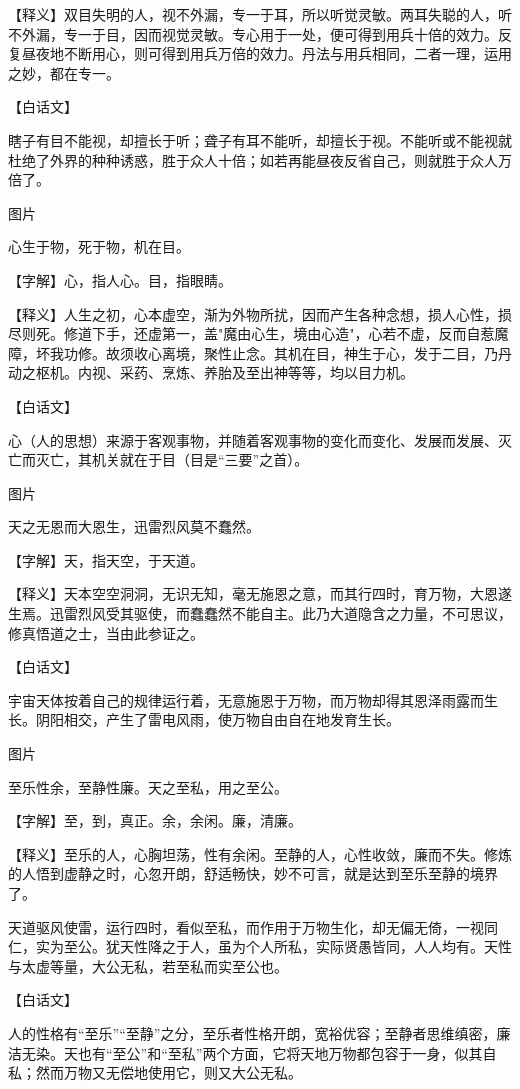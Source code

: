 \documentclass[12pt,UTF8]{ctexbook}
\begin{document}
【释义】双目失明的人，视不外漏，专一于耳，所以听觉灵敏。两耳失聪的人，听不外漏，专一于目，因而视觉灵敏。专心用于一处，便可得到用兵十倍的效力。反复昼夜地不断用心，则可得到用兵万倍的效力。丹法与用兵相同，二者一理，运用之妙，都在专一。


【白话文】


瞎子有目不能视，却擅长于听；聋子有耳不能听，却擅长于视。不能听或不能视就杜绝了外界的种种诱惑，胜于众人十倍；如若再能昼夜反省自己，则就胜于众人万倍了。

图片​


心生于物，死于物，机在目。


【字解】心，指人心。目，指眼睛。


【释义】人生之初，心本虚空，渐为外物所扰，因而产生各种念想，损人心性，损尽则死。修道下手，还虚第一，盖"魔由心生，境由心造"，心若不虚，反而自惹魔障，坏我功修。故须收心离境，聚性止念。其机在目，神生于心，发于二目，乃丹动之枢机。内视、采药、烹炼、养胎及至出神等等，均以目力机。


【白话文】


心（人的思想）来源于客观事物，并随着客观事物的变化而变化、发展而发展、灭亡而灭亡，其机关就在于目（目是“三要”之首）。


图片​


天之无恩而大恩生，迅雷烈风莫不蠢然。


【字解】天，指天空，于天道。


【释义】天本空空洞洞，无识无知，毫无施恩之意，而其行四时，育万物，大恩遂生焉。迅雷烈风受其驱使，而蠢蠢然不能自主。此乃大道隐含之力量，不可思议，修真悟道之士，当由此参证之。


【白话文】


宇宙天体按着自己的规律运行着，无意施恩于万物，而万物却得其恩泽雨露而生长。阴阳相交，产生了雷电风雨，使万物自由自在地发育生长。


图片​


至乐性余，至静性廉。天之至私，用之至公。


【字解】至，到，真正。余，余闲。廉，清廉。


【释义】至乐的人，心胸坦荡，性有余闲。至静的人，心性收敛，廉而不失。修炼的人悟到虚静之时，心忽开朗，舒适畅快，妙不可言，就是达到至乐至静的境界了。


天道驱风使雷，运行四时，看似至私，而作用于万物生化，却无偏无倚，一视同仁，实为至公。犹天性降之于人，虽为个人所私，实际贤愚皆同，人人均有。天性与太虚等量，大公无私，若至私而实至公也。


【白话文】


人的性格有“至乐”“至静”之分，至乐者性格开朗，宽裕优容；至静者思维缜密，廉洁无染。天也有“至公”和“至私”两个方面，它将天地万物都包容于一身，似其自私；然而万物又无偿地使用它，则又大公无私。
\end{document}
